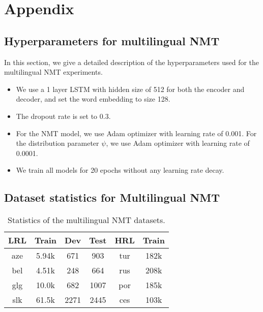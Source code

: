 \section{\label{app} Appendix}

\subsection{\label{app:nmt_hparam} Hyperparameters for multilingual NMT}
In this section, we give a detailed description of the hyperparameters used for the multilingual NMT experiments.
\begin{itemize}
    \item We use a 1 layer LSTM with hidden size of 512 for both the encoder and decoder, and set the word embedding to size 128.
    \item The dropout rate is set to 0.3.
    \item For the NMT model, we use Adam optimizer with learning rate of 0.001. For the distribution parameter $\psi$, we use Adam optimizer with learning rate of 0.0001.
    \item We train all models for 20 epochs without any learning rate decay.
\end{itemize}

\subsection{\label{app:nmt_data} Dataset statistics for Multilingual NMT}
\begin{table}[H]
  \centering
  \begin{tabular}{c|ccc|cc}
  \toprule
  \textbf{LRL} & \textbf{Train} & \textbf{Dev} & \textbf{Test} & \textbf{HRL} & \textbf{Train} \\
  \midrule
  aze & 5.94k &  671 &  903 & tur & 182k \\
  bel & 4.51k &  248 &  664 & rus & 208k \\
  glg & 10.0k &  682 & 1007 & por & 185k \\
  slk & 61.5k & 2271 & 2445 & ces & 103k\\
  \bottomrule
  \end{tabular}
  \vspace{0.2cm}
  \caption{\label{tab:nmt_data}Statistics of the multilingual NMT datasets.}
\end{table} 